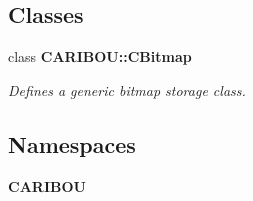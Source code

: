 \subsection*{Classes}
\begin{DoxyCompactItemize}
\item 
class {\bf C\-A\-R\-I\-B\-O\-U\-::\-C\-Bitmap}
\begin{DoxyCompactList}\small\item\em Defines a generic bitmap storage class. \end{DoxyCompactList}\end{DoxyCompactItemize}
\subsection*{Namespaces}
\begin{DoxyCompactItemize}
\item 
{\bf C\-A\-R\-I\-B\-O\-U}
\end{DoxyCompactItemize}
